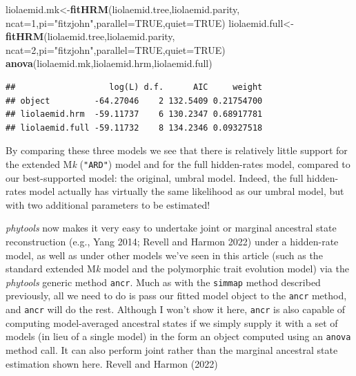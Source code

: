 \documentclass[fleqn,10pt,lineno]{wlpeerj} %
\newenvironment{Shaded}{\begin{snugshade}}{\end{snugshade}}
\newcommand{\AttributeTok}[1]{\textcolor[rgb]{0.13,0.29,0.53}{#1}}
\newcommand{\ConstantTok}[1]{\textcolor[rgb]{0.56,0.35,0.01}{#1}}
\newcommand{\DecValTok}[1]{\textcolor[rgb]{0.00,0.00,0.81}{#1}}
\newcommand{\FunctionTok}[1]{\textcolor[rgb]{0.13,0.29,0.53}{\textbf{#1}}}
\newcommand{\NormalTok}[1]{#1}
\newcommand{\OtherTok}[1]{\textcolor[rgb]{0.56,0.35,0.01}{#1}}
\newcommand{\StringTok}[1]{\textcolor[rgb]{0.31,0.60,0.02}{#1}}
\begin{document}
\begin{Shaded}
\begin{Highlighting}[]
\NormalTok{liolaemid.mk}\OtherTok{\textless{}{-}}\FunctionTok{fitHRM}\NormalTok{(liolaemid.tree,liolaemid.parity,}
  \AttributeTok{ncat=}\DecValTok{1}\NormalTok{,}\AttributeTok{pi=}\StringTok{"fitzjohn"}\NormalTok{,}\AttributeTok{parallel=}\ConstantTok{TRUE}\NormalTok{,}\AttributeTok{quiet=}\ConstantTok{TRUE}\NormalTok{)}
\NormalTok{liolaemid.full}\OtherTok{\textless{}{-}}\FunctionTok{fitHRM}\NormalTok{(liolaemid.tree,liolaemid.parity,}
  \AttributeTok{ncat=}\DecValTok{2}\NormalTok{,}\AttributeTok{pi=}\StringTok{"fitzjohn"}\NormalTok{,}\AttributeTok{parallel=}\ConstantTok{TRUE}\NormalTok{,}\AttributeTok{quiet=}\ConstantTok{TRUE}\NormalTok{)}
\FunctionTok{anova}\NormalTok{(liolaemid.mk,liolaemid.hrm,liolaemid.full)}
\end{Highlighting}
\end{Shaded}

\begin{verbatim}
##                   log(L) d.f.      AIC     weight
## object         -64.27046    2 132.5409 0.21754700
## liolaemid.hrm  -59.11737    6 130.2347 0.68917781
## liolaemid.full -59.11732    8 134.2346 0.09327518
\end{verbatim}

By comparing these three models we see that there is relatively little support for the extended M\emph{k} (\texttt{"ARD"}) model and for the full hidden-rates model, compared to our best-supported model: the original, umbral model. Indeed, the full hidden-rates model actually has virtually the same likelihood as our umbral model, but with two additional parameters to be estimated!

\emph{phytools} now makes it very easy to undertake joint or marginal ancestral state reconstruction (e.g., Yang 2014; Revell and Harmon 2022) under a hidden-rate model, as well as under other models we've seen in this article (such as the standard extended M\emph{k} model and the polymorphic trait evolution model) via the \emph{phytools} generic method \texttt{ancr}. Much as with the \texttt{simmap} method described previously, all we need to do is pass our fitted model object to the \texttt{ancr} method, and \texttt{ancr} will do the rest. Although I won't show it here, \texttt{ancr} is also capable of computing model-averaged ancestral states if we simply supply it with a set of models (in lieu of a single model) in the form an object computed using an \texttt{anova} method call. It can also perform joint rather than the marginal ancestral state estimation shown here. Revell and Harmon (2022)
\end{document}
